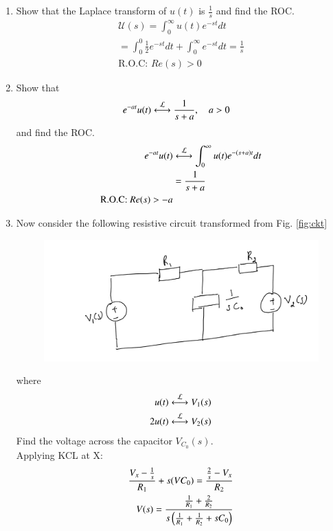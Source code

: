 \documentclass[journal,12pt,twocolumn]{IEEEtran}
\renewcommand\thesection{\arabic{section}}
\begin{document}
\begin{enumerate}[label=\arabic*.,ref=\thesection.\theenumi]
\item Show that the Laplace transform of $u(t)$ is $\frac{1}{s}$ and find the ROC.\\
\solution
\begin{align}
	\mathcal{U}(s) = \int_{0}^{\infty}u(t)e^{-st}dt \\
	= \int_{0}^{0}\frac{1}{2}e^{-st}dt + \int_{0}^{\infty}e^{-st}dt 
	= \frac{1}{s}\\
	\text{R.O.C: } Re(s) > 0
	\label{eq:L-u}
\end{align}
\item Show that 
	\begin{align}
		e^{-at}u(t) &\overset{\mathcal{L}}{\longleftrightarrow} \frac{1}{s+a}, \quad a > 0
	\end{align}
and find the ROC.\\
\solution
\begin{align}
	e^{-at}u(t) &\overset{\mathcal{L}}{\longleftrightarrow} \int_{0}^{\infty}u(t)e^{-(s + a)t}dt \\
	&= \frac{1}{s + a}\\
		\text{R.O.C: } Re(s) > -a
	\label{eq:L-u-shift}
\end{align}
\item Now consider the following resistive circuit transformed from 
Fig. \ref{fig:ckt}
\begin{figure}[!ht]
	\centering
	\includegraphics[width=\columnwidth]{./figs/lap-ckt.jpg}
	\caption{}
	\label{fig:lap-ckt}
\end{figure}
where 
\begin{align}
	u(t) \overset{\mathcal{L}}{\longleftrightarrow} V_1(s)
	\\
	2u(t) \overset{\mathcal{L}}{\longleftrightarrow} V_2(s)
	\label{eq:V2}
\end{align}
Find the voltage across the capacitor $V_{C_0}(s)$.\\
\solution
Applying KCL at X:
\begin{align}
	\dfrac{V_x - \frac{1}{s}}{R_1} + s(V C_0)= \dfrac{\frac{2}{s} - V_x}{R_2}\\
	V(s) = \frac{\frac{1}{R_1} + \frac{2}{R_2}}{s\brak{\frac{1}{R_1} + \frac{1}{R_2} + sC_0}} \\

\end{align}
\end{enumerate}
\end{document}
